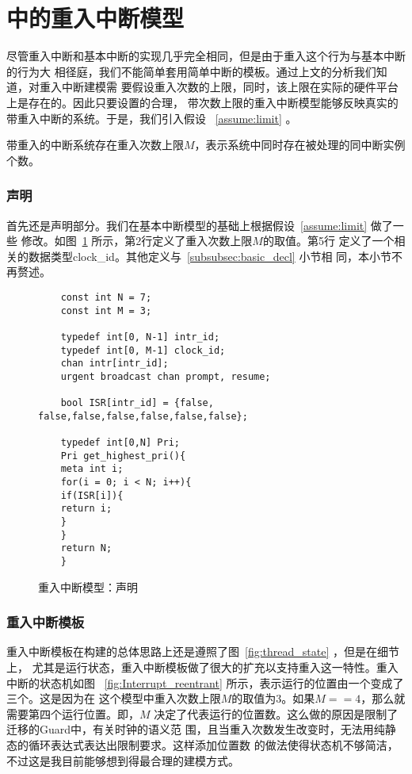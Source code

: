 \section{\uppaal 中的重入中断模型}
\label{subsec:reentrant_uppaal}

尽管重入中断和基本中断的实现几乎完全相同，但是由于重入这个行为与基本中断的行为大
相径庭，我们不能简单套用简单中断的模板。通过上文的分析我们知道，对重入中断建模需
要假设重入次数的上限，同时，该上限在实际的硬件平台上是存在的。因此只要设置的合理，
带次数上限的重入中断模型能够反映真实的带重入中断的系统。于是，我们引入假设
~\ref{assume:limit} 。

\begin{assumption}
	带重入的中断系统存在重入次数上限$M$，表示系统中同时存在被处理的同中断实例个数。
	\label{assume:limit}
\end{assumption}

\subsubsection{声明}
\label{subsubsec:reentrant_decl}

首先还是声明部分。我们在基本中断模型的基础上根据假设~\ref{assume:limit} 做了一些
修改。如图~\ref{fig:reentrant_decl} 所示，第2行定义了重入次数上限$M$的取值。第5行
定义了一个相关的数据类型clock\_id。其他定义与~\ref{subsubsec:basic_decl} 小节相
同，本小节不再赘述。

\begin{figure}[H]
	\centering
	\begin{lstlisting}
	const int N = 7;
	const int M = 3;
	
	typedef int[0, N-1] intr_id; 
	typedef int[0, M-1] clock_id;
	chan intr[intr_id];
	urgent broadcast chan prompt, resume;
	
	bool ISR[intr_id] = {false, false,false,false,false,false,false};
	
	typedef int[0,N] Pri;
	Pri get_highest_pri(){
	meta int i;
	for(i = 0; i < N; i++){
	if(ISR[i]){
	return i;
	} 
	}
	return N;
	}
	\end{lstlisting}
	\caption{重入中断模型：声明}
	\label{fig:reentrant_decl}
\end{figure}

\subsubsection{重入中断模板}
\label{subsubsec:reentrant_intr}
重入中断模板在构建的总体思路上还是遵照了图~\ref{fig:thread_state} ，但是在细节上，
尤其是运行状态，重入中断模板做了很大的扩充以支持重入这一特性。重入中断的状态机如图
~\ref{fig:Interrupt_reentrant} 所示，表示运行的位置由一个变成了三个。这是因为在
这个模型中重入次数上限$M$的取值为3。如果$M==4$，那么就需要第四个运行位置。即，$M$
决定了代表运行的位置数。这么做的原因是\uppaal 限制了迁移的Guard中，有关时钟的语义范
围，且当重入次数发生改变时，无法用纯静态的循环表达式表达出限制要求。这样添加位置数
的做法使得状态机不够简洁，不过这是我目前能够想到得最合理的建模方式。

